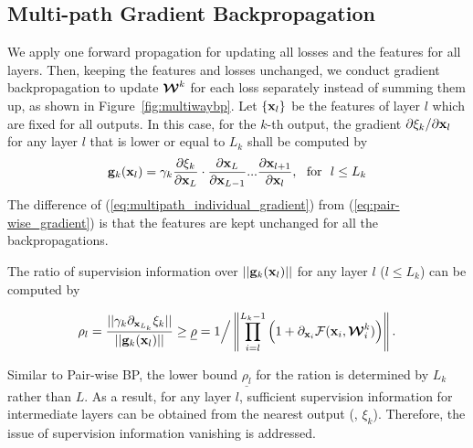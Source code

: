 \documentclass[10pt,onecolumn,letterpaper]{article}
\def\mF{{\mathcal F}}
\def\bmW{\mbox{\boldmath${\mathcal W}$}}
\def\bg{{\bf g}}
\def\bx{{\bf x}}
\def\SexyName{AuxNet\xspace}
\begin{document}


\subsection{Multi-path Gradient Backpropagation}
We apply one forward propagation for updating all losses and the features for all layers. Then, keeping the features and losses unchanged, we conduct gradient backpropagation to update $\bmW^{k}$ for each loss separately  instead of summing them up, as shown in Figure~\ref{fig:multiwaybp}.
Let $\{\bx_l\}$ be the features of layer $l$ which are fixed for all outputs. In this case, for the $k$-th output, the gradient ${{\partial \xi_k }}/{{\partial {\bx_l}}}$ for any layer $l$ that is lower or equal to $L_k$ shall be computed by
\begin{eqnarray} \label{eq:multipath_individual_gradient}
\bg_k(\bx_{l}) = \gamma_k \frac{\partial \xi_k }{ \partial \bx_{L} }  \cdot \frac{\partial \bx_{L} }{ \partial \bx_{L-1} }  ...\frac{\partial  \bx_{l+1}  }{\partial \bx_{l} }, ~~\mathrm{for}~~ l\leq L_k
\end{eqnarray}
The difference of (\ref{eq:multipath_individual_gradient}) from (\ref{eq:pair-wise_gradient}) is that the features are kept unchanged for all the backpropagations.

The ratio of supervision information over $||\bg_k(\bx_{l})||$ for any layer $l$ ($l\leq L_k$) can be computed by
\begin{small}{$$\rho_l = \frac{||\gamma_k{\partial_{\bx_{L_k}} \xi_k }||}{||\bg_k(\bx_{l})||} \geq \underline{\rho} =  1 \Big/ \left\|\prod\limits_{i = l}^{L_k - 1} \Big( {1 + \partial_{\bx_i}  {\mF({\bx_i},{{\bmW}_i^k})}} \Big)\right\|.$$}\end{small}
Similar to Pair-wise BP, the lower bound $\underline{\rho_l}$ for the ration is determined by $L_k$ rather than $L$. As a result, for any layer $l$, sufficient supervision information for intermediate layers can be obtained from the nearest output (\ie, $\xi_k$). Therefore, the issue of supervision information vanishing is addressed.
\end{document}
